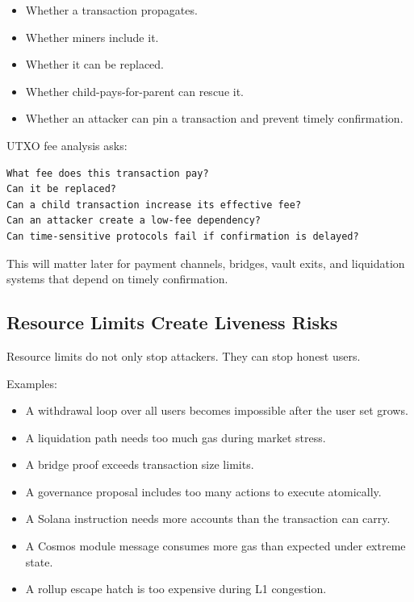 \begin{itemize}
\tightlist
\item
  Whether a transaction propagates.
\item
  Whether miners include it.
\item
  Whether it can be replaced.
\item
  Whether child-pays-for-parent can rescue it.
\item
  Whether an attacker can pin a transaction and prevent timely
  confirmation.
\end{itemize}

UTXO fee analysis asks:

\begin{lstlisting}
What fee does this transaction pay?
Can it be replaced?
Can a child transaction increase its effective fee?
Can an attacker create a low-fee dependency?
Can time-sensitive protocols fail if confirmation is delayed?
\end{lstlisting}

This will matter later for payment channels, bridges, vault exits, and
liquidation systems that depend on timely confirmation.

\subsection{Resource Limits Create Liveness Risks}

Resource limits do not only stop attackers. They can stop honest users.

Examples:

\begin{itemize}
\tightlist
\item
  A withdrawal loop over all users becomes impossible after the user set
  grows.
\item
  A liquidation path needs too much gas during market stress.
\item
  A bridge proof exceeds transaction size limits.
\item
  A governance proposal includes too many actions to execute atomically.
\item
  A Solana instruction needs more accounts than the transaction can
  carry.
\item
  A Cosmos module message consumes more gas than expected under extreme
  state.
\item
  A rollup escape hatch is too expensive during L1 congestion.
\end{itemize}

